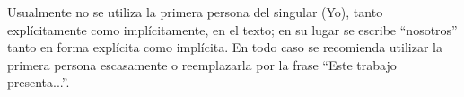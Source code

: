 Usualmente no se utiliza la primera persona del singular (Yo), tanto explícitamente como implícitamente, en el texto; en su lugar se escribe “nosotros” tanto en forma explícita como implícita. En todo caso se recomienda utilizar la primera persona escasamente o reemplazarla por la frase “Este trabajo presenta...”.